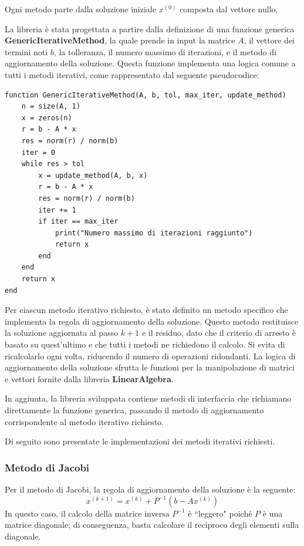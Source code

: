 Ogni metodo parte dalla soluzione iniziale $x^{(0)}$ composta dal vettore nullo.

La libreria è stata progettata a partire dalla definizione di una funzione generica
\textbf{GenericIterativeMethod}, la quale prende in input la matrice $A$, il
vettore dei termini noti $b$, la tolleranza, il numero massimo di iterazioni, e
il metodo di aggiornamento della soluzione. Questa funzione implementa una logica
comune a tutti i metodi iterativi, come rappresentato dal seguente pseudocodice:
\begin{verbatim}
function GenericIterativeMethod(A, b, tol, max_iter, update_method)
    n = size(A, 1)
    x = zeros(n)
    r = b - A * x
    res = norm(r) / norm(b)
    iter = 0
    while res > tol
        x = update_method(A, b, x)
        r = b - A * x
        res = norm(r) / norm(b)
        iter += 1
        if iter == max_iter
            print("Numero massimo di iterazioni raggiunto")
            return x
        end
    end
    return x
end
\end{verbatim}

Per ciascun metodo iterativo richiesto, è stato definito un metodo specifico che
implementa la regola di aggiornamento della soluzione. Questo metodo restituisce
la soluzione aggiornata al passo $k+1$ e il residuo, dato che il criterio di
arresto è basato su quest'ultimo e che tutti i metodi ne richiedono il calcolo.
Si evita di ricalcolarlo ogni volta, riducendo il numero di operazioni ridondanti.
La logica di aggiornamento della soluzione sfrutta le funzioni per la manipolazione
di matrici e vettori fornite dalla libreria \textbf{LinearAlgebra}.

In aggiunta, la libreria sviluppata contiene metodi di interfaccia che richiamano
direttamente la funzione generica, passando il metodo di aggiornamento corrispondente
al metodo iterativo richiesto.

Di seguito sono presentate le implementazioni dei metodi iterativi richiesti.
\subsubsection{Metodo di Jacobi}
Per il metodo di Jacobi, la regola di aggiornamento della soluzione è la seguente:
\begin{equation}
    x^{(k+1)} = x^{(k)} + P^{-1}(b - Ax^{(k)})
\end{equation}
In questo caso, il calcolo della matrice inversa $P^{-1}$ è ``leggero" poiché $P$
è una matrice diagonale; di conseguenza, basta calcolare il reciproco degli
elementi sulla diagonale.

